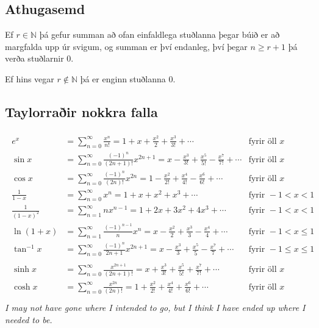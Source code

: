 \documentclass[a4paper,10pt,icelandic]{sphinxmanual}
\begin{document}
\subsection{Athugasemd}
\label{kafli10:id6}
Ef \(r \in {{\mathbb  N}}\) þá gefur summan að ofan einfaldlega
stuðlanna þegar búið er að margfalda upp úr svigum, og summan er því
endanleg, því þegar \(n \geq r+1\) þá verða stuðlarnir 0.

Ef hins vegar \(r\notin {{\mathbb  N}}\) þá er enginn stuðlanna 0.


\subsection{Taylorraðir nokkra falla}
\label{kafli10:taylorrair-nokkra-falla}\begin{equation*}
\begin{split}\begin{aligned}
e^x&=\sum_{n=0}^\infty\frac{x^n}{n!}
    =1+x+\frac{x^2}{2}+\frac{x^3}{3!}
    +\cdots
  &\mbox{fyrir öll }x\\
\sin x&=  \sum_{n=0}^\infty\frac{(-1)^n}{(2n+1)!}x^{2n+1}
    =x-\frac{x^3}{3!}+\frac{x^5}{5!}-\frac{x^7}{7!}+\cdots
    &\mbox{fyrir öll }x\\
\cos x&=  \sum_{n=0}^\infty\frac{(-1)^n}{(2n)!}x^{2n}
    =1-\frac{x^2}{2!}+\frac{x^4}{4!}-\frac{x^6}{6!}+\cdots
    &\mbox{fyrir öll }x\\
\frac{1}{1-x}&=\sum_{n=0}^\infty x^n
    =1+x+x^2+x^3+\cdots
&\mbox{fyrir }-1<x<1\\
\frac{1}{(1-x)^2}&=\sum_{n=1}^\infty nx^{n-1}
    =1+2x+3x^2+4x^3+\cdots
&\mbox{fyrir }-1<x<1\\
\ln(1+x)&=  \sum_{n=1}^\infty\frac{(-1)^{n-1}}{n}x^n
    =x-\frac{x^2}{2}+\frac{x^3}{3}-\frac{x^4}{4}+\cdots
    &\mbox{fyrir }-1<x\leq 1\\
\tan^{-1} x&=  \sum_{n=0}^\infty\frac{(-1)^n}{2n+1}x^{2n+1}
    =x-\frac{x^3}{3}+\frac{x^5}{5}-\frac{x^7}{7}+\cdots
    &\mbox{fyrir }-1\leq x\leq 1\\\\
\sinh x&=  \sum_{n=0}^\infty\frac{x^{2n+1}}{(2n+1)!}
    =x+\frac{x^3}{3!}+\frac{x^5}{5!}+\frac{x^7}{7!}+\cdots
    &\mbox{fyrir öll } x\\
\cosh x&=  \sum_{n=0}^\infty\frac{x^{2n}}{(2n)!}
    =1+\frac{x^2}{2!}+\frac{x^4}{4!}+\frac{x^6}{6!}+\cdots
    &\mbox{fyrir öll } x\\\end{aligned}\end{split}
\end{equation*}
\emph{I may not have gone where I intended to go, but I think I have ended up where I needed to be.}
\end{document}
